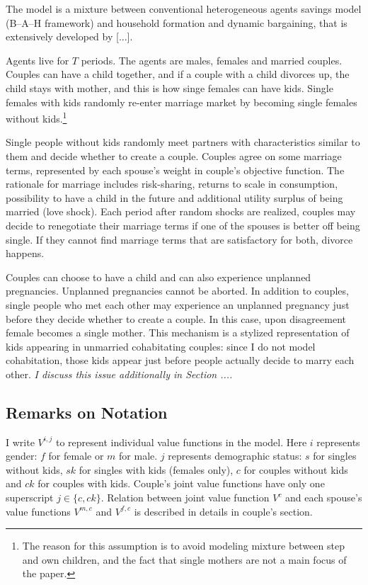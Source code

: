 The model is a mixture between conventional heterogeneous agents savings model (B--A--H framework) and household formation and dynamic bargaining, that is extensively developed by [...]. 

Agents live for $T$ periods. The agents are males, females and married couples. Couples can have a child together, and if a couple with a child divorces up, the child stays with mother, and this is how singe females can have kids. Single females with kids randomly re-enter marriage market by becoming single females without kids.\footnote{The reason for this assumption is to avoid modeling mixture between step and own children, and the fact that single mothers are not a main focus of the paper.}


Single people without kids randomly meet partners with characteristics similar to them and decide whether to create a couple. Couples agree on some marriage terms, represented by each spouse's weight in couple's objective function. The rationale for marriage includes risk-sharing, returns to scale in consumption, possibility to have a child in the future and additional utility surplus of being married (love shock). Each period after random shocks are realized, couples may decide to renegotiate their marriage terms if one of the spouses is better off being single. If they cannot find marriage terms that are satisfactory for both, divorce happens.

Couples can choose to have a child and can also experience unplanned pregnancies. Unplanned pregnancies cannot be aborted. In addition to couples, single people who met each other may experience an unplanned pregnancy just before they decide whether to create a couple. In this case, upon disagreement female becomes a single mother. This mechanism is a stylized representation of kids appearing in unmarried cohabitating couples: since I do not model cohabitation, those kids appear just before people actually decide to marry each other.\textit{ I discuss this issue additionally in Section ....}

\subsection{Remarks on Notation}
I write $V^{i,j}$ to represent individual value functions in the model. Here $i$ represents gender: $f$ for female or $m$ for male. $j$ represents demographic status: $s$ for singles without kids, $sk$ for singles with kids (females only), $c$ for couples without kids and $ck$ for couples with kids. Couple's joint value functions have only one superscript $j \in \{c,ck\}$. Relation between joint value function $V^{c}$ and each spouse's value functions $V^{m,c}$ and $V^{f,c}$ is described in details in couple's section.

